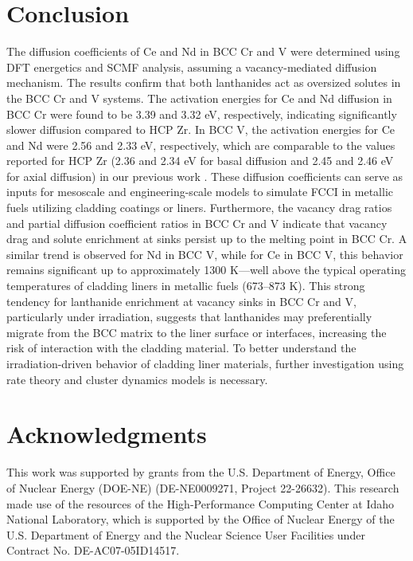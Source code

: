 \documentclass[preprint,12pt]{elsarticle}
\begin{document}
\FloatBarrier
\section{Conclusion}
The diffusion coefficients of Ce and Nd in BCC Cr and V were determined using DFT energetics and SCMF analysis, assuming a vacancy-mediated diffusion mechanism. The results confirm that both lanthanides act as oversized solutes in the BCC Cr and V systems. The activation energies for Ce and Nd diffusion in BCC Cr were found to be 3.39 and 3.32 eV, respectively, indicating significantly slower diffusion compared to HCP Zr. In BCC V, the activation energies for Ce and Nd were 2.56 and 2.33 eV, respectively, which are comparable to the values reported for HCP Zr (2.36 and 2.34 eV for basal diffusion and 2.45 and 2.46 eV for axial diffusion) in our previous work \citep{shousha2024first}. These diffusion coefficients can serve as inputs for mesoscale and engineering-scale models to simulate FCCI in metallic fuels utilizing cladding coatings or liners. Furthermore, the vacancy drag ratios and partial diffusion coefficient ratios in BCC Cr and V indicate that vacancy drag and solute enrichment at sinks persist up to the melting point in BCC Cr. A similar trend is observed for Nd in BCC V, while for Ce in BCC V, this behavior remains significant up to approximately 1300 K—well above the typical operating temperatures of cladding liners in metallic fuels (673–873 K). This strong tendency for lanthanide enrichment at vacancy sinks in BCC Cr and V, particularly under irradiation, suggests that lanthanides may preferentially migrate from the BCC matrix to the liner surface or interfaces, increasing the risk of interaction with the cladding material. To better understand the irradiation-driven behavior of cladding liner materials, further investigation using rate theory and cluster dynamics models is necessary.

\FloatBarrier
\section{Acknowledgments}

This work was supported by grants from the U.S. Department of Energy, Office of Nuclear Energy (DOE-NE) (DE-NE0009271, Project 22-26632). This research made use of the resources of the High-Performance Computing Center at Idaho National Laboratory, which is supported by the Office of Nuclear Energy of the U.S. Department of Energy and the Nuclear Science User Facilities under Contract No. DE-AC07-05ID14517.
\end{document}

